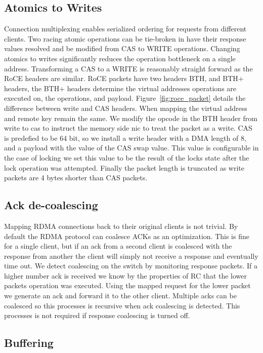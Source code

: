 \subsection{Atomics to Writes}

Connection multiplexing enables serialized ordering for
requests from different clients. Two racing atomic
operations can be tie-broken in {\sword} have their response
values resolved and be modified from CAS to WRITE
operations. Changing atomics to writes significantly reduces
the operation bottleneck on a single address. 
Transforming a CAS to a WRITE is reasonably straight forward
as the RoCE headers are similar. RoCE packets have two
headers BTH, and BTH+ headers, the BTH+ headers determine
the virtual addresses operations are executed on, the
operations, and payload. Figure~\ref{fig:roce_packet} details
the difference between write and CAS headers. When mapping
the virtual address and remote key remain the same. We
modify the opcode in the BTH header from write to cas to
instruct the memory side nic to treat the packet as a write.
CAS is predefied to be 64 bit, so we install a write header
with a DMA length of 8, and a payload with the value of the
CAS swap value. This value is configurable in the case of
locking we set this value to be the result of the locks
state after the lock operation was attempted. Finally the
packet length is truncated as write packets are 4 bytes
shorter than CAS packets.

\subsection{Ack de-coalescing}

Mapping RDMA connections back to their original clients is
not trivial. By default the RDMA protocol can coalesce ACKs
as an optimization. This is fine for a single client, but if
an ack from a second client is coalesced with the response
from another the client will simply not receive a response
and eventually time out. We detect coalescing on the switch
by monitoring response packets. If a higher number ack is
received we know by the properties of RC that the lower
packets operation was executed. Using the mapped request for
the lower packet we generate an ack and forward it to the
other client. Multiple acks can be coalesced so this
processes is recursive when ack coalescing is detected. This
processes is not required if response coalescing is turned
off.

\subsection{Buffering}

